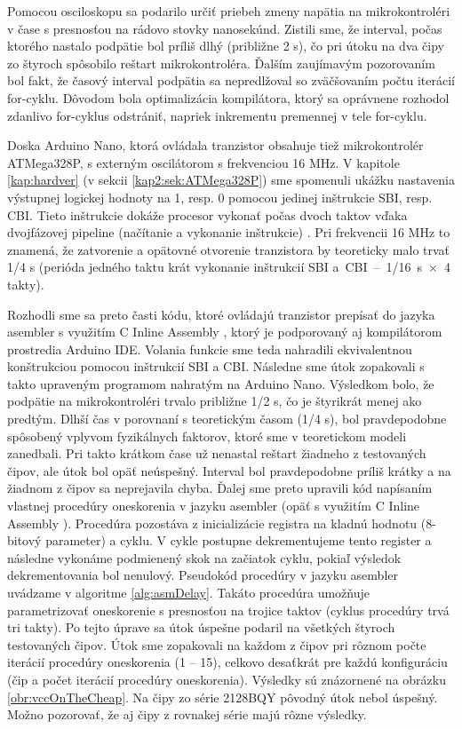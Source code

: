 Pomocou osciloskopu sa podarilo určiť priebeh zmeny napätia na mikrokontroléri v čase s presnosťou na rádovo stovky nanosekúnd. Zistili sme, že interval, počas ktorého nastalo podpätie bol príliš dlhý (približne 2 {\textmu}s), čo pri útoku na dva čipy zo štyroch spôsobilo reštart mikrokontroléra. Ďalším zaujímavým pozorovaním bol fakt, že časový interval podpätia sa nepredlžoval so zväčšovaním počtu iterácií  for-cyklu. Dôvodom bola optimalizácia kompilátora, ktorý sa oprávnene rozhodol zdanlivo  for-cyklus odstrániť, napriek inkrementu premennej  v tele for-cyklu.

Doska Arduino Nano, ktorá ovládala tranzistor obsahuje tiež mikrokontrolér ATMega328P, s externým oscilátorom s frekvenciou 16 MHz. V kapitole \ref{kap:hardver} (v sekcii \ref{kap2:sek:ATMega328P}) sme spomenuli ukážku nastavenia výstupnej logickej hodnoty na 1, resp. 0 pomocou jedinej inštrukcie SBI, resp. CBI. Tieto inštrukcie dokáže procesor vykonať počas dvoch taktov vďaka dvojfázovej pipeline (načítanie a vykonanie inštrukcie) \cite{atmegaData}. Pri frekvencii 16 MHz to znamená, že zatvorenie a opätovné otvorenie tranzistora by teoreticky malo trvať 1/4 {\textmu}s (perióda jedného taktu krát vykonanie inštrukcií SBI a~CBI~--~1/16~{\textmu}s~$\times$~4 takty). 

Rozhodli sme sa preto časti kódu, ktoré ovládajú tranzistor prepísať do jazyka asembler s využitím C Inline Assembly \cite{inlineAsm}, ktorý je podporovaný aj kompilátorom prostredia Arduino IDE. Volania funkcie  sme teda nahradili ekvivalentnou konštrukciou pomocou inštrukcií SBI a CBI. Následne sme útok zopakovali s takto upraveným programom nahratým na Arduino Nano. Výsledkom bolo, že podpätie na mikrokontroléri trvalo približne 1/2 {\textmu}s, čo je štyrikrát menej ako predtým. Dlhší čas v porovnaní s teoretickým časom (1/4 {\textmu}s), bol pravdepodobne spôsobený vplyvom fyzikálnych faktorov, ktoré sme v teoretickom modeli zanedbali. Pri takto krátkom čase už nenastal reštart žiadneho z testovaných čipov, ale útok bol opäť neúspešný. Interval bol pravdepodobne príliš krátky a na žiadnom z čipov sa neprejavila chyba. Ďalej sme preto upravili kód napísaním vlastnej procedúry oneskorenia v jazyku asembler (opäť s využitím C Inline Assembly \cite{inlineAsm}). Procedúra pozostáva z inicializácie registra na kladnú hodnotu (8-bitový parameter) a cyklu. V cykle postupne dekrementujeme tento register a následne vykonáme podmienený skok na začiatok cyklu, pokiaľ výsledok dekrementovania bol nenulový. Pseudokód procedúry v jazyku asembler uvádzame v algoritme \ref{alg:asmDelay}. Takáto procedúra umožňuje parametrizovať oneskorenie s presnosťou na trojice taktov (cyklus procedúry trvá tri takty). Po tejto úprave sa útok úspešne podaril na všetkých štyroch testovaných čipov. Útok sme zopakovali na každom z čipov pri rôznom počte iterácií procedúry oneskorenia (1 -- 15), celkovo desaťkrát pre každú konfiguráciu (čip a počet iterácií procedúry oneskorenia). Výsledky sú znázornené na obrázku \ref{obr:vccOnTheCheap}. Na čipy zo série 2128BQY pôvodný útok nebol úspešný. Možno pozorovať, že aj čipy z rovnakej série majú rôzne výsledky.

